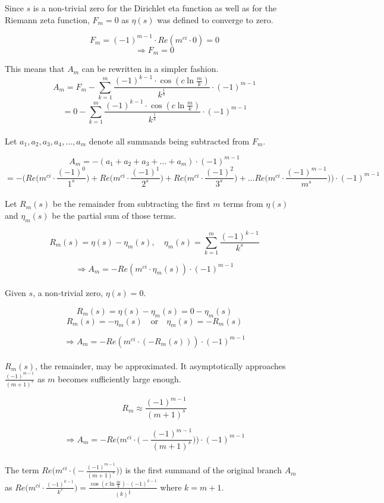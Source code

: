 \documentclass{amsart}
\begin{document}
	Since $s$ is a non-trivial zero for the Dirichlet eta function as well as for the Riemann zeta function, $F_m = 0$ as $\eta(s)$ was defined to converge to zero.
	
	\[ F_m = (-1)^{m-1} \cdot Re(m^{ci} \cdot 0) = 0 \]
	\[ \Rightarrow F_m = 0 \]
	
	This means that $A_m$ can be rewritten in a simpler fashion.
	\[ A_m = F_m - \sum\limits_{k=1}^{m} \frac{(-1)^{k-1} {\cdot} \cos(c \ln \frac{m}{k})}{k^{\frac{1}{b}}} {\cdot} (-1)^{m-1} \]
	\[\]
	\[ = 0 - \sum\limits_{k=1}^{m} \frac{(-1)^{k-1} {\cdot} \cos(c \ln \frac{m}{k})}{k^{\frac{1}{b}}} {\cdot} (-1)^{m-1} \]
	\\
	Let $a_1, a_2, a_3, a_4, \dots , a_m$ denote all summands being subtracted from $F_m$.
	
	\[ A_m = -( a_1 + a_2 + a_3 + \dots + a_m ) {\cdot} (-1)^{m-1}  \]
	\[\]
	\[ = - \Bigg( Re\Big( m^{ci}{\cdot}\frac{(-1)^{0}}{1^s}  \Big) + Re\Big( m^{ci}{\cdot}\frac{(-1)^{1}}{2^s}  \Big) + Re\Big( m^{ci}{\cdot}\frac{(-1)^{2}}{3^s}  \Big) + \dots Re\Big( m^{ci}{\cdot}\frac{(-1)^{m-1}}{m^s}  \Big)     \Bigg) {\cdot} (-1)^{m-1} \]
	\\
	Let $R_m(s)$ be the remainder from subtracting the first $m$ terms from $\eta(s)$ and $\eta_m(s)$ be the partial sum of those terms.
	
	\[ R_m(s) = \eta(s) - \eta_m(s) , \quad \eta_m(s) = \sum\limits_{k=1}^{m}\frac{(-1)^{k-1}}{k^s} \]
	
	\[ \Rightarrow A_m = - Re(m^{ci} {\cdot} \eta_m(s) ) {\cdot} (-1)^{m-1} \]
	\\
	Given $s$, a non-trivial zero, $\eta(s)=0$.
	
	\[ R_m(s) = \eta(s) - \eta_m(s) = 0 - \eta_m(s) \]
	\[ R_m(s) = -\eta_m(s) \quad \text{or} \quad \eta_m(s) = -R_m(s) \]
	
	\[ \Rightarrow A_m = - Re(m^{ci} {\cdot} (-R_m(s)) ) {\cdot} (-1)^{m-1} \]
	\\
	
	$R_m(s)$, the remainder, may be approximated. It asymptotically approaches $\frac{(-1)^{m-1}}{(m+1)^s}$ as $m$ becomes sufficiently large enough.
	
	\[ R_m \approx \frac{(-1)^{m-1}}{(m+1)^s} \]
	
	\[ \Rightarrow A_m = - Re\Bigg(m^{ci} {\cdot} \Big(-\frac{(-1)^{m-1}}{(m+1)^s}\Big) \Bigg) {\cdot} (-1)^{m-1} \]
	\\
	The term $Re\Bigg(m^{ci} {\cdot} \Big(-\frac{(-1)^{m-1}}{(m+1)^s}\Big) \Bigg)$ is the first summand of the original branch $A_m$ as $ Re\Bigg(m^{ci} {\cdot} \frac{(-1)^{k-1}}{k^s} \Bigg) = \frac{\cos(c \ln \frac{m}{k}){\cdot}(-1)^{k-1}}{(k)^{\frac{1}{b}}} $ where $k = m+1$. 
	
\end{document}
